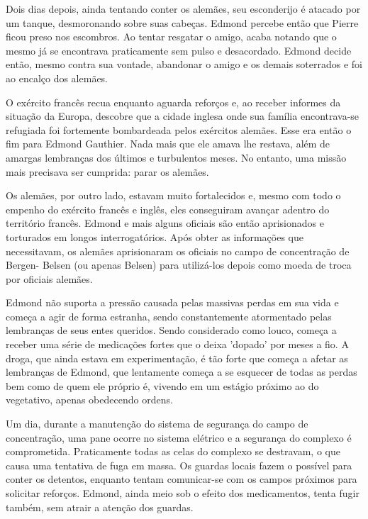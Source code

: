     Dois dias depois, ainda tentando conter os alemães, seu esconderijo é atacado por um tanque, desmoronando sobre suas cabeças. Edmond percebe então que Pierre ficou preso nos escombros. Ao tentar resgatar o amigo, acaba notando que o mesmo já se encontrava praticamente sem pulso e desacordado. Edmond decide então, mesmo contra sua vontade, abandonar o amigo e os demais soterrados e foi ao encalço dos alemães.
    
    O exército francês recua enquanto aguarda reforços e, ao receber informes da situação da Europa, descobre que a cidade inglesa onde sua família encontrava-se refugiada foi fortemente bombardeada pelos exércitos alemães. Esse era então o fim para Edmond Gauthier. Nada mais que ele amava lhe restava, além de amargas lembranças dos últimos e turbulentos meses. No entanto, uma missão mais precisava ser cumprida: parar os alemães.
    
    Os alemães, por outro lado, estavam muito fortalecidos e, mesmo com todo o empenho do exército francês e inglês, eles conseguiram avançar adentro do território francês. Edmond e mais alguns oficiais são então aprisionados e torturados em longos interrogatórios. Após obter as informações que necessitavam, os alemães aprisionaram os oficiais no campo de concentração de Bergen- Belsen (ou apenas Belsen) para utilizá-los depois como moeda de troca por oficiais alemães.
    
    Edmond não suporta a pressão causada pelas massivas perdas em sua vida e começa a agir de forma estranha, sendo constantemente atormentado pelas lembranças de seus entes queridos. Sendo considerado como louco, começa a receber uma série de medicações fortes que o deixa 'dopado' por meses a fio. A droga, que ainda estava em experimentação,  é tão forte que começa a afetar as lembranças de Edmond, que lentamente começa a se esquecer de todas as perdas bem como de quem ele próprio é, vivendo em um estágio próximo ao do vegetativo, apenas obedecendo ordens.
    
    Um dia, durante a manutenção do sistema de segurança do campo de concentração, uma pane ocorre no sistema elétrico e a segurança do complexo é comprometida. Praticamente todas as celas do complexo se destravam, o que causa uma tentativa de fuga em massa. Os guardas locais fazem o possível para conter os detentos, enquanto tentam comunicar-se com os campos próximos para solicitar reforços. Edmond, ainda meio sob o efeito dos medicamentos, tenta fugir também, sem atrair a atenção dos guardas. 
    

